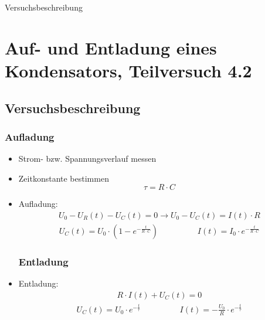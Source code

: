 \documentclass[11pt]{beamer}
\begin{document}


\begin{frame}{Versuchsbeschreibung}
\section{Auf- und Entladung eines Kondensators, Teilversuch 4.2}
\subsection{Versuchsbeschreibung}
\subsubsection*{Aufladung}
\begin{itemize}
\item Strom- bzw. Spannungsverlauf messen
\item Zeitkonstante bestimmen
\[\tau = R \cdot C \]
\item Aufladung:
\begin{align*}
U_0-U_R(t)-U_C(t)=0 \rightarrow U_0-U_C(t)=I(t) \cdot R
\end{align*}
\begin{align*}
U_C(t)=U_0 \cdot (1-e^{-\frac{t}{R \cdot C}}) \hspace{2cm} I(t)=I_0 \cdot e^{-\frac{t}{R \cdot C}}
\end{align*}
\subsubsection*{Entladung}
\item Entladung:
\begin{align*}
R \cdot I(t) + U_C(t) = 0
\end{align*}
\begin{align*}
U_C(t)=U_0 \cdot e^{-\frac{t}{\tau}} \hspace{2cm} I(t)=-\frac{U_0}{R} \cdot e^{-\frac{t}{\tau}}
\end{align*}
\end{itemize}
\end{frame}
\end{document}
